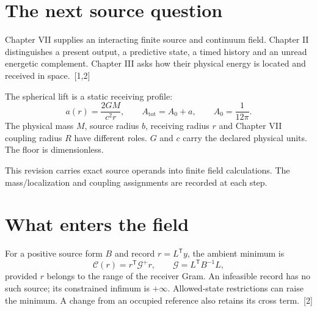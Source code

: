 \documentclass[10pt,twocolumn,letterpaper]{article}
\begin{document}
\raggedbottom
{}

\section{The next source question}
Chapter VII supplies an interacting finite source and continuum field. Chapter II distinguishes a present output, a predictive state, a timed history and an unread energetic complement. Chapter III asks how their physical energy is located and received in space.~[1,2]

The spherical lift is a static receiving profile:
\[
a(r)=\frac{2GM}{c^2r},\qquad A_{\mathrm{tot}}=A_0+a,\qquad A_0=\frac{1}{12\pi}.
\]
The physical mass $M$, source radius $b$, receiving radius $r$ and Chapter VII coupling radius $R$ have different roles. $G$ and $c$ carry the declared physical units. The floor is dimensionless.

This revision carries exact source operands into finite field calculations. The mass/localization and coupling assignments are recorded at each step.

\section{What enters the field}
For a positive source form $B$ and record $r=L^{\mathsf T}y$, the ambient minimum is
\[
\mathcal C(r)=r^{\mathsf T}\mathcal G^+r,\qquad \mathcal G=L^{\mathsf T}B^{-1}L,
\]
provided $r$ belongs to the range of the receiver Gram. An infeasible record has no such source; its constrained infimum is $+\infty$. Allowed-state restrictions can raise the minimum. A change from an occupied reference also retains its cross term.~[2]
\end{document}
